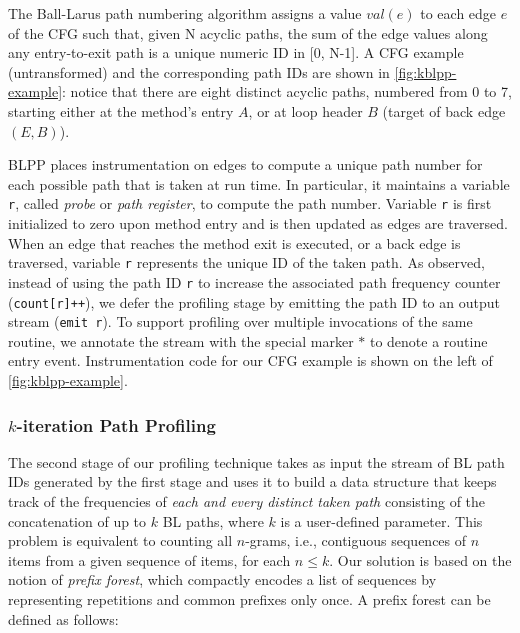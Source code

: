 \ifauthorea{\newline}{}
\noindent The Ball-Larus path numbering algorithm
assigns a value $val(e)$ to each edge $e$ of the CFG such that, given N acyclic paths, the sum of the edge values along any entry-to-exit path is a unique numeric ID in [0, N-1]. A CFG example (untransformed) and the corresponding path IDs are shown in \myfigure\ref{fig:kblpp-example}: notice that there are eight distinct acyclic paths, numbered from 0 to 7, starting either at the method's entry $A$, or at loop header $B$ (target of back edge $(E,B)$).

BLPP places instrumentation on edges to compute a unique path number for each possible path that is taken at run time. In particular, it maintains a variable {\tt r}, called {\em probe} or {\em path register}, to compute the path number. Variable {\tt r} is first initialized to zero upon method entry and is then updated as edges are traversed. When an edge that reaches the method exit is executed, or a back edge is traversed, variable {\tt r} represents the unique ID of the taken path. As observed, instead of using the path ID {\tt r} to increase the associated path frequency counter ({\tt count[r]++}), we defer the profiling stage by emitting the path ID to an output stream ({\tt emit r}). To support profiling over multiple invocations of the same routine, we annotate the stream with the special marker $*$ to denote a routine entry event. Instrumentation code for our CFG example is shown on the left of \myfigure\ref{fig:kblpp-example}.

\subsubsection*{$k$-iteration Path Profiling}
The second stage of our profiling technique takes as input the stream of BL path IDs generated by the first stage and uses it to build a data structure that keeps track of the frequencies of {\em each and every distinct taken path} consisting of the concatenation of up to $k$ BL paths, where $k$ is a user-defined parameter. This problem is equivalent to counting all $n$-grams, i.e., contiguous sequences of $n$ items from a given sequence of items, for each $n\le k$. Our solution is based on the notion of {\em prefix forest}, which compactly encodes a list of sequences by representing repetitions and common prefixes only once. A prefix forest can be defined as follows:

